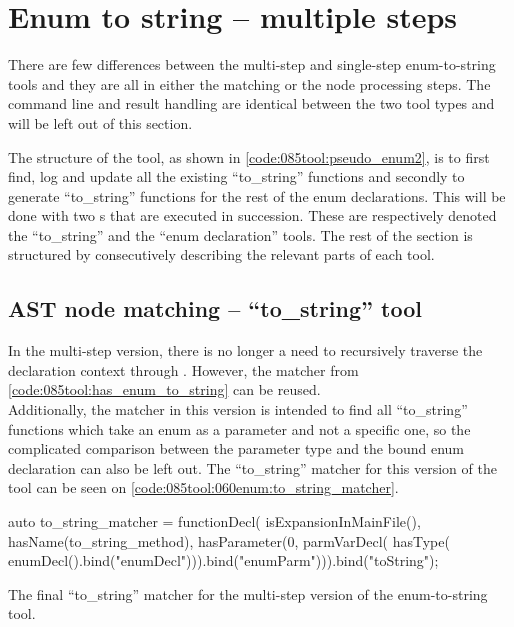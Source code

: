 \section{Enum to string -- multiple steps}\label{sec:085dev:060en_mul:mul_step}

There are few differences between the multi-step and single-step enum-to-string tools and they are all in either the matching or the node processing steps. The command line and result handling are identical between the two tool types and will be left out of this section.

The structure of the tool, as shown in \cref{code:085tool:pseudo_enum2}, is to first find, log and update all the existing ``to\_string'' functions and secondly to generate ``to\_string'' functions for the rest of the enum declarations.
This will be done with two s that are executed in succession. These are respectively denoted the ``to\_string'' and the ``enum declaration'' tools. The rest of the section is structured by consecutively describing the relevant parts of each tool.

\subsection{AST node matching -- ``to\_string'' tool}
In the multi-step version, there is no longer a need to recursively traverse the declaration context through .
However, the  matcher from \cref{code:085tool:has_enum_to_string} can be reused.\\
Additionally, the matcher in this version is intended to find all ``to\_string'' functions which take an enum as a parameter and not a specific one, so the complicated comparison between the parameter type and the bound enum declaration can also be left out.
The ``to\_string'' matcher for this version of the tool can be seen on \cref{code:085tool:060enum:to_string_matcher}.

\begin{listing}[H]
    \begin{cppcode}
auto to_string_matcher = functionDecl(
  isExpansionInMainFile(),
  hasName(to_string_method),
  hasParameter(0, 
    parmVarDecl(
	  hasType(
	    enumDecl().bind("enumDecl"))).bind("enumParm"))).bind("toString");
    \end{cppcode}
    \caption{The final ``to\_string'' matcher for the multi-step version of the enum-to-string tool.}
    \label{code:085tool:060enum:to_string_matcher}
\end{listing}

